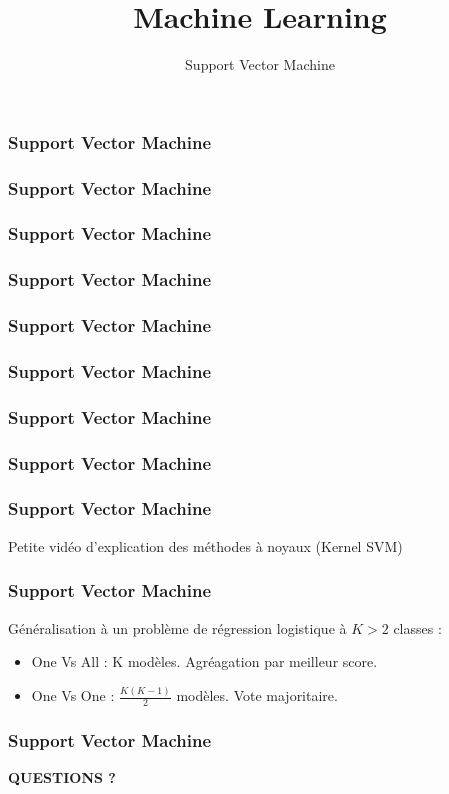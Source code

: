 \documentclass{formation}
\title{Machine Learning}
\subtitle{Support Vector Machine}
\begin{document}
\maketitle

\begin{frame}
  \frametitle{Support Vector Machine}
\end{frame}

\begin{frame}
  \frametitle{Support Vector Machine}
\end{frame}

\begin{frame}
  \frametitle{Support Vector Machine}
\end{frame}

\begin{frame}
  \frametitle{Support Vector Machine}
\end{frame}

\begin{frame}
  \frametitle{Support Vector Machine}
\end{frame}

\begin{frame}
  \frametitle{Support Vector Machine}
\end{frame}

\begin{frame}
  \frametitle{Support Vector Machine}
\end{frame}

\begin{frame}
  \frametitle{Support Vector Machine}
\end{frame}

\begin{frame}
  \frametitle{Support Vector Machine}
  \begin{center}
    Petite vidéo d'explication des méthodes à noyaux (Kernel SVM)
  \end{center}
\end{frame}

\begin{frame}
  \frametitle{Support Vector Machine}
  Généralisation à un problème de régression logistique à $K>2$ classes :
  \begin{itemize}
  \item One Vs All : K modèles. Agréagation par meilleur score.
  \item One Vs One : $\frac{K(K-1)}{2}$ modèles. Vote majoritaire.
  \end{itemize}
\end{frame}

\begin{frame}
  \frametitle{Support Vector Machine}
  \begin{center}
   \textbf{QUESTIONS ?}
  \end{center}
\end{frame}
\end{document}
